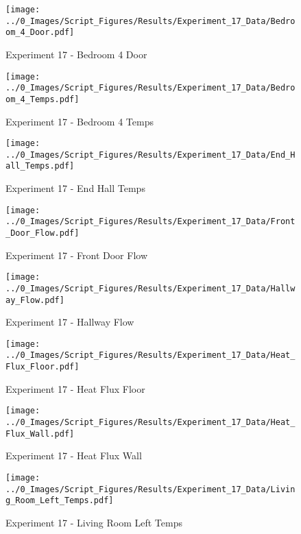 	\clearpage

	\begin{figure}[H]
		\centering
		\texttt{[image: ../0\_Images/Script\_Figures/Results/Experiment\_17\_Data/Bedroom\_4\_Door.pdf]}
		\caption[]{Experiment 17 - Bedroom 4 Door}
	\end{figure}
 

	\begin{figure}[H]
		\centering
		\texttt{[image: ../0\_Images/Script\_Figures/Results/Experiment\_17\_Data/Bedroom\_4\_Temps.pdf]}
		\caption[]{Experiment 17 - Bedroom 4 Temps}
	\end{figure}
 
	\clearpage

	\begin{figure}[H]
		\centering
		\texttt{[image: ../0\_Images/Script\_Figures/Results/Experiment\_17\_Data/End\_Hall\_Temps.pdf]}
		\caption[]{Experiment 17 - End Hall Temps}
	\end{figure}
 

	\begin{figure}[H]
		\centering
		\texttt{[image: ../0\_Images/Script\_Figures/Results/Experiment\_17\_Data/Front\_Door\_Flow.pdf]}
		\caption[]{Experiment 17 - Front Door Flow}
	\end{figure}
 
	\clearpage

	\begin{figure}[H]
		\centering
		\texttt{[image: ../0\_Images/Script\_Figures/Results/Experiment\_17\_Data/Hallway\_Flow.pdf]}
		\caption[]{Experiment 17 - Hallway Flow}
	\end{figure}
 

	\begin{figure}[H]
		\centering
		\texttt{[image: ../0\_Images/Script\_Figures/Results/Experiment\_17\_Data/Heat\_Flux\_Floor.pdf]}
		\caption[]{Experiment 17 - Heat Flux Floor}
	\end{figure}
 
	\clearpage

	\begin{figure}[H]
		\centering
		\texttt{[image: ../0\_Images/Script\_Figures/Results/Experiment\_17\_Data/Heat\_Flux\_Wall.pdf]}
		\caption[]{Experiment 17 - Heat Flux Wall}
	\end{figure}
 

	\begin{figure}[H]
		\centering
		\texttt{[image: ../0\_Images/Script\_Figures/Results/Experiment\_17\_Data/Living\_Room\_Left\_Temps.pdf]}
		\caption[]{Experiment 17 - Living Room Left Temps}
	\end{figure}
 
